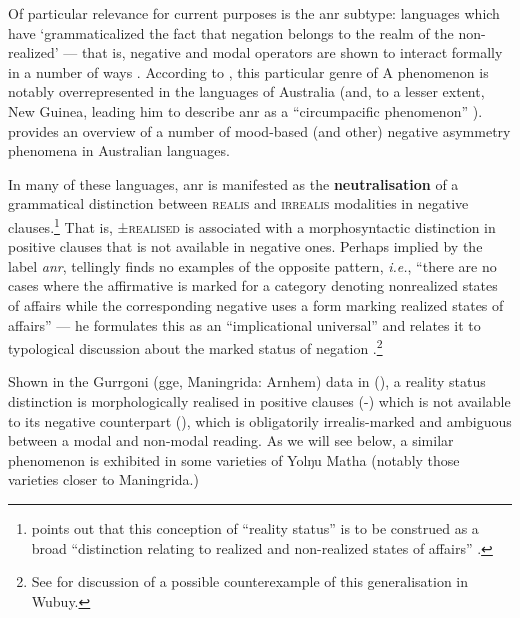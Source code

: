 Of particular relevance for current purposes is the \acrshort{anr} subtype: languages which have `grammaticalized the fact that negation belongs to the realm of the non-realized' --- that is, negative and modal operators are shown to interact formally in a number of ways \citet[208]{Miestamo2005}. According to \citeauthor{Miestamo2005}, this particular genre of \acrlong{A} phenomenon is notably overrepresented in the languages of Australia (and, to a lesser extent, New Guinea, leading him to describe \acrshort{anr} as a ``circumpacific phenomenon'' \citeyearpar[192,]{Miestamo2005}).
 \citet[\S2.2]{Phillips2021b} provides an overview of a number of mood-based (and other) negative asymmetry phenomena in Australian languages.


In many of these languages, \acrshort{anr} is manifested as the \textbf{neutralisation} of a grammatical distinction between \textsc{realis} and \textsc{irrealis} modalities in negative clauses.\footnote{\citeauthor{Miestamo2005} points out that this conception of ``reality status'' is to be construed as a broad ``distinction relating to realized and non-realized states of affairs'' \citeyearpar[96]{Miestamo2005}.} That is, ±\textsc{realised} is associated with a morphosyntactic distinction in positive clauses that is not available in negative ones. Perhaps implied by the label \textit{\acrshort{anr}}, \citeauthor{Miestamo2005} tellingly finds no examples of the opposite pattern, \textit{i.e.}, ``there are no cases where the affirmative is marked for a category denoting nonrealized states of affairs while the corresponding negative uses a form marking realized states of affairs'' --- he formulates this as an ``implicational universal'' and relates it to typological discussion about the marked status of negation \citeyearpar[96--7]{Miestamo2005}.\footnote{See \citet[107--8]{Miestamo2005} for discussion of a possible counterexample of this generalisation in Wubuy.}



Shown in the Gurrgoni (\gls{gge}, Maningrida: Arnhem) data in (), a reality status distinction is morphologically realised in positive clauses (-) which is not available to its negative counterpart (), which is obligatorily irrealis-marked and ambiguous between a modal and non-modal reading. As we will see below, a similar phenomenon is exhibited in some varieties of Yolŋu Matha (notably those varieties closer to Maningrida.)


